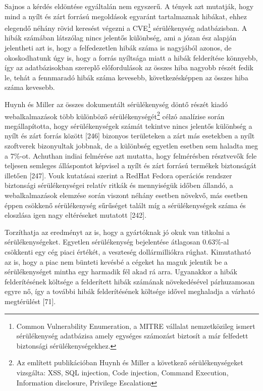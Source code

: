 \documentclass[12pt,magyar,a4paper,oneside]{scrreprt}
\begin{document}
Sajnos a kérdés eldöntése egyáltalán nem egyszerű. A tények azt
mutatják, hogy mind a nyílt és zárt forrású megoldások egyaránt
tartalmaznak hibákat, ehhez elegendő néhány rövid keresést végezni a
CVE\footnote{Common Vulnerability Enumeration, a MITRE vállalat
  nemzetközileg ismert sérülékenység adatbázisa amely egységes számozást
  biztosít a már felfedett biztonsági sérülékenységekhez.} sérülékenység
adatbázisban. A hibák számában látszólag nincs jelentős különbség, ami a
józan ész alapján jelentheti azt is, hogy a felfedezetlen hibák száma is
nagyjából azonos, de okoskodhatunk úgy is, hogy a forrás nyíltsága miatt
a hibák felderítése könnyebb, így az adatbázisokban szereplő
előfordulások az összes hiba nagyobb részét fedik le, tehát a fennmaradó
hibák száma kevesebb, következésképpen az összes hiba száma kevesebb.

Huynh és Miller az összes dokumentált sérülékenység döntő részét kiadó
webalkalmazások több különböző sérülékenységét\footnote{Az említett
  publikációban Huynh és Miller a következő sérülékenységeket vizsgálta:
  XSS, SQL injection, Code injection, Command Execution, Information
  disclosure, Privilege Escalation} célzó analízise során
megállapította, hogy sérülékenységek számát tekintve nincs jelentős
különbség a nyílt és zárt forrás között {[}246{]} bizonyos területeken a
zárt más esetekben a nyílt szoftverek bizonyultak jobbnak, de a
különbség egyetlen esetben sem haladta meg a 7\%-ot. Achuthan indiai
felmérése azt mutatta, hogy felmérésben résztvevők fele teljesen
semleges álláspontot képvisel a nyílt és zárt forrású termékek
biztonságát illetően {[}247{]}. Vouk kutatásai szerint a RedHat Fedora
operációs rendszer biztonsági sérülékenységei relatív ritkák és
mennyiségük időben állandó, a webalkalmazások elemzése során viszont
néhány esetben növekvő, más esetben éppen csökkenő sérülékenység
sűrűséget talált míg a sérülékenységek száma és eloszlása igen nagy
eltéréseket mutatott {[}242{]}.

Torzíthatja az eredményt az is, hogy a gyártóknak jó okuk van titkolni a
sérülékenységeket. Egyetlen sérülékenység bejelentése átlagosan
0.63\%-al csökkenti egy cég piaci értékét, a veszteség dollármilliókra
rúghat. Kimutatható az is, hogy a piac nem bünteti kevésbé a cégeket ha
maguk jelentik be a sérülékenységet mintha egy harmadik fél akad rá
arra. Ugyanakkor a hibák felderítésének költsége a felderített hibák
számának növekedésével párhuzamosan egyre nő, így a további hibák
felderítésének költsége idővel meghaladja a várható megtérülést
{[}71{]}.
\end{document}
